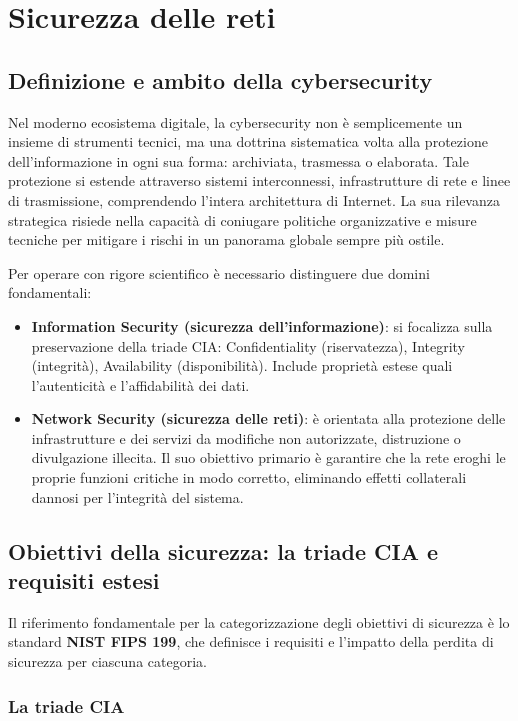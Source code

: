 \section{Sicurezza delle reti}

\subsection{Definizione e ambito della cybersecurity}

Nel moderno ecosistema digitale, la cybersecurity non è semplicemente un insieme
di strumenti tecnici, ma una dottrina sistematica volta alla protezione
dell'informazione in ogni sua forma: archiviata, trasmessa o elaborata. Tale
protezione si estende attraverso sistemi interconnessi, infrastrutture di rete
e linee di trasmissione, comprendendo l'intera architettura di Internet. La sua
rilevanza strategica risiede nella capacità di coniugare politiche organizzative
e misure tecniche per mitigare i rischi in un panorama globale sempre più ostile.

Per operare con rigore scientifico è necessario distinguere due domini fondamentali:

\begin{itemize}
\item \textbf{Information Security (sicurezza dell'informazione)}: si focalizza
sulla preservazione della triade CIA: Confidentiality (riservatezza), Integrity
(integrità), Availability (disponibilità). Include proprietà estese quali
l'autenticità e l'affidabilità dei dati.
\item \textbf{Network Security (sicurezza delle reti)}: è orientata alla
protezione delle infrastrutture e dei servizi da modifiche non autorizzate,
distruzione o divulgazione illecita. Il suo obiettivo primario è garantire che
la rete eroghi le proprie funzioni critiche in modo corretto, eliminando effetti
collaterali dannosi per l'integrità del sistema.
\end{itemize}

\subsection{Obiettivi della sicurezza: la triade CIA e requisiti estesi}

Il riferimento fondamentale per la categorizzazione degli obiettivi di sicurezza
è lo standard \textbf{NIST FIPS 199}, che definisce i requisiti e l'impatto della
perdita di sicurezza per ciascuna categoria.

\subsubsection{La triade CIA}

